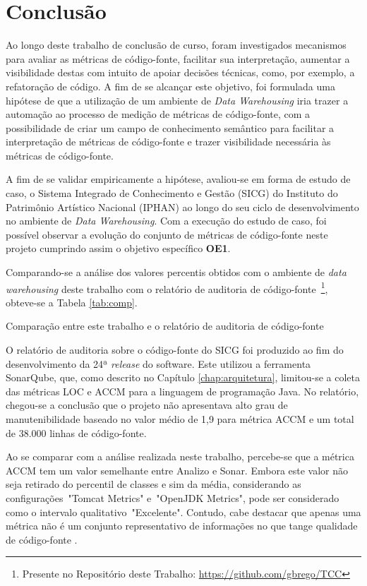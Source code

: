 \chapter{Conclusão}


Ao longo deste trabalho de conclusão de curso, foram investigados mecanismos para avaliar as métricas de código-fonte, facilitar sua interpretação, aumentar a visibilidade destas com intuito de apoiar decisões técnicas, como, por exemplo, a refatoração de código. A fim de se alcançar este objetivo, foi formulada uma hipótese de que a utilização de um ambiente de \textit{Data Warehousing} iria trazer a automação ao processo de medição de métricas de código-fonte, com a possibilidade de criar um campo de conhecimento semântico para facilitar a interpretação de métricas de código-fonte e trazer visibilidade necessária às métricas de código-fonte.


A fim de se validar empiricamente a hipótese, avaliou-se em forma de estudo de caso, o Sistema Integrado de Conhecimento e Gestão (SICG) do Instituto do Patrimônio Artístico Nacional (IPHAN) ao longo do seu ciclo de desenvolvimento no ambiente de \textit{Data Warehousing}. Com a execução do estudo de caso, foi possível observar a evolução do conjunto de métricas de código-fonte neste projeto cumprindo assim o objetivo específico \textbf{OE1}.

Comparando-se a análise dos valores percentis obtidos com o ambiente de \textit{data warehousing} deste trabalho com o relatório de auditoria de código-fonte~\footnote{Presente no Repositório deste Trabalho: \url{https://github.com/gbrego/TCC}}, obteve-se a Tabela \ref{tab:comp}.

\begin{table}[!ht]
\centering

\caption{Comparação entre este trabalho e o relatório de auditoria de código-fonte}
\label{tab:comp}
\end{table}
\FloatBarrier

O relatório de auditoria sobre o código-fonte do SICG foi produzido ao fim do desenvolvimento da 24ª \textit{release} do software. Este utilizou a ferramenta SonarQube, que, como descrito no Capítulo \ref{chap:arquitetura}, limitou-se a coleta das métricas LOC e ACCM para a linguagem de programação Java. No relatório, chegou-se a conclusão que o projeto não apresentava alto grau de manutenibilidade baseado no valor médio de 1,9 para métrica ACCM e um total de 38.000 linhas de código-fonte. 

Ao se comparar com a análise realizada neste trabalho, percebe-se que a métrica ACCM tem um valor semelhante entre Analizo e Sonar. Embora este valor não seja retirado do percentil de classes e sim da média, considerando as configurações~"Tomcat Metrics" e~"OpenJDK Metrics", pode ser considerado como o intervalo qualitativo~"Excelente". Contudo, cabe destacar que apenas uma métrica não é um conjunto representativo de informações no que tange qualidade de código-fonte \cite{Meirelles2013}.


